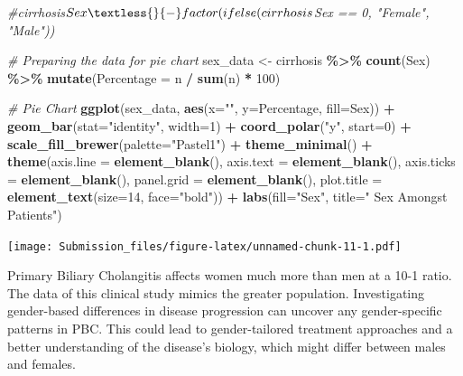 \documentclass[
]{article}
\newenvironment{Shaded}{\begin{snugshade}}{\end{snugshade}}
\newcommand{\AttributeTok}[1]{\textcolor[rgb]{0.13,0.29,0.53}{#1}}
\newcommand{\CommentTok}[1]{\textcolor[rgb]{0.56,0.35,0.01}{\textit{#1}}}
\newcommand{\DecValTok}[1]{\textcolor[rgb]{0.00,0.00,0.81}{#1}}
\newcommand{\FunctionTok}[1]{\textcolor[rgb]{0.13,0.29,0.53}{\textbf{#1}}}
\newcommand{\NormalTok}[1]{#1}
\newcommand{\OtherTok}[1]{\textcolor[rgb]{0.56,0.35,0.01}{#1}}
\newcommand{\SpecialCharTok}[1]{\textcolor[rgb]{0.81,0.36,0.00}{\textbf{#1}}}
\newcommand{\StringTok}[1]{\textcolor[rgb]{0.31,0.60,0.02}{#1}}
\begin{document}
\begin{Shaded}
\begin{Highlighting}[]
\CommentTok{\#cirrhosis$Sex \textless{}{-} factor(ifelse(cirrhosis$Sex == 0, "Female", "Male"))}

\CommentTok{\# Preparing the data for pie chart}
\NormalTok{sex\_data }\OtherTok{\textless{}{-}}\NormalTok{ cirrhosis }\SpecialCharTok{\%\textgreater{}\%} 
            \FunctionTok{count}\NormalTok{(Sex) }\SpecialCharTok{\%\textgreater{}\%} 
            \FunctionTok{mutate}\NormalTok{(}\AttributeTok{Percentage =}\NormalTok{ n }\SpecialCharTok{/} \FunctionTok{sum}\NormalTok{(n) }\SpecialCharTok{*} \DecValTok{100}\NormalTok{)}

\CommentTok{\# Pie Chart}
\FunctionTok{ggplot}\NormalTok{(sex\_data, }\FunctionTok{aes}\NormalTok{(}\AttributeTok{x=}\StringTok{""}\NormalTok{, }\AttributeTok{y=}\NormalTok{Percentage, }\AttributeTok{fill=}\NormalTok{Sex)) }\SpecialCharTok{+}
    \FunctionTok{geom\_bar}\NormalTok{(}\AttributeTok{stat=}\StringTok{"identity"}\NormalTok{, }\AttributeTok{width=}\DecValTok{1}\NormalTok{) }\SpecialCharTok{+}
    \FunctionTok{coord\_polar}\NormalTok{(}\StringTok{"y"}\NormalTok{, }\AttributeTok{start=}\DecValTok{0}\NormalTok{) }\SpecialCharTok{+}
    \FunctionTok{scale\_fill\_brewer}\NormalTok{(}\AttributeTok{palette=}\StringTok{"Pastel1"}\NormalTok{) }\SpecialCharTok{+}
    \FunctionTok{theme\_minimal}\NormalTok{() }\SpecialCharTok{+}
    \FunctionTok{theme}\NormalTok{(}\AttributeTok{axis.line =} \FunctionTok{element\_blank}\NormalTok{(),}
          \AttributeTok{axis.text =} \FunctionTok{element\_blank}\NormalTok{(),}
          \AttributeTok{axis.ticks =} \FunctionTok{element\_blank}\NormalTok{(),}
          \AttributeTok{panel.grid =} \FunctionTok{element\_blank}\NormalTok{(),}
          \AttributeTok{plot.title =} \FunctionTok{element\_text}\NormalTok{(}\AttributeTok{size=}\DecValTok{14}\NormalTok{, }\AttributeTok{face=}\StringTok{"bold"}\NormalTok{)) }\SpecialCharTok{+}
    \FunctionTok{labs}\NormalTok{(}\AttributeTok{fill=}\StringTok{"Sex"}\NormalTok{, }\AttributeTok{title=}\StringTok{" Sex Amongst Patients"}\NormalTok{)}
\end{Highlighting}
\end{Shaded}

\texttt{[image: Submission\_files/figure-latex/unnamed-chunk-11-1.pdf]}

Primary Biliary Cholangitis affects women much more than men at a 10-1
ratio. The data of this clinical study mimics the greater population.
Investigating gender-based differences in disease progression can
uncover any gender-specific patterns in PBC. This could lead to
gender-tailored treatment approaches and a better understanding of the
disease's biology, which might differ between males and females.
\end{document}
